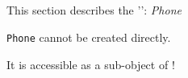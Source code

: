 
\subsection{}

This section describes the '': \textsl{Phone}

\begin{description}
\vspace{3mm}  \item[Creation:] \texttt{Phone} cannot be created directly.\

It is accessible as a sub-object of !

\end{description}

